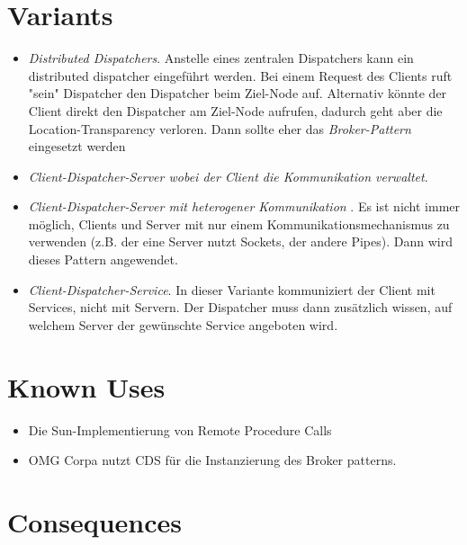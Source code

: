\section{Variants}
\begin{itemize}
	\item \textit{Distributed Dispatchers}. Anstelle eines zentralen Dispatchers kann ein distributed dispatcher eingeführt werden. Bei einem Request des Clients ruft "sein" Dispatcher den Dispatcher beim Ziel-Node auf. Alternativ könnte der Client direkt den Dispatcher am Ziel-Node aufrufen, dadurch geht aber die Location-Transparency verloren. Dann sollte eher das \textit{Broker-Pattern} eingesetzt werden
	\item \textit{Client-Dispatcher-Server wobei der Client die Kommunikation verwaltet}. 
	\item \textit{Client-Dispatcher-Server mit heterogener Kommunikation }. Es ist nicht immer möglich, Clients und Server mit nur einem Kommunikationsmechanismus zu verwenden (z.B. der eine Server nutzt Sockets, der andere Pipes). Dann wird dieses Pattern angewendet.
	\item \textit{Client-Dispatcher-Service}. In dieser Variante kommuniziert der Client mit Services, nicht mit Servern. Der Dispatcher muss dann zusätzlich wissen, auf welchem Server der gewünschte Service angeboten wird.
\end{itemize}

\section{Known Uses}
\begin{itemize}
	\item Die Sun-Implementierung von Remote Procedure Calls
	\item OMG Corpa nutzt CDS für die Instanzierung des Broker patterns.
\end{itemize}

\section{Consequences}
\begin{itemize}
\end{itemize}


